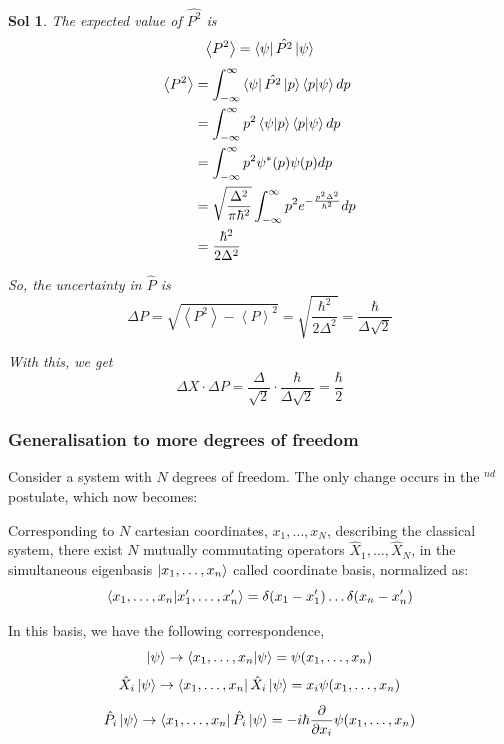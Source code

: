 \documentclass[12pt,a4paper]{report}
\newcommand{\rom}[1]{\Romannum{#1}}
\newcommand{\parder}[2]{\frac{\partial#1}{\partial#2}}
\newcommand{\expected}[1]{\left \langle #1 \right \rangle}
\newtheorem*{solution}{Sol}
\begin{document}
\begin{solution}
    The expected value of $\hat{P^2}$ is
    \begin{equation*}
        \expected{P^2} = \bra{\psi}\hat{P^2}\ket{\psi}
    \end{equation*}
    \begin{align*}
        \expected{P^2} &= \int_{-\infty}^{\infty}\bra{\psi}\hat{P^2}\ket{p}\bra{p}\ket{\psi} dp \\
        &= \int_{-\infty}^{\infty}p^2\bra{\psi}\ket{p}\bra{p}\ket{\psi} dp \\
        &= \int_{-\infty}^{\infty}p^2\psi^*(p)\psi(p) dp \\
        &= \sqrt{\frac{\Delta^2}{\pi \hbar^2}}\int_{-\infty}^{\infty}p^2e^{-\frac{p^2\Delta^2}{\hbar^2}} dp \\
        &= \frac{\hbar^2}{2\Delta^2}
    \end{align*}

    So, the uncertainty in $\hat{P}$ is
    \begin{equation*}
        \Delta P = \sqrt{\expected{P^2} - \expected{P}^2} = \sqrt{\frac{\hbar^2}{2\Delta^2}} = \frac{\hbar}{\Delta\sqrt{2}}
    \end{equation*}

    With this, we get
    \begin{equation*}
        \Delta X \cdot \Delta P = \frac{\Delta}{\sqrt{2}} \cdot \frac{\hbar}{\Delta\sqrt{2}} = \frac{\hbar}{2}
    \end{equation*}
\end{solution}
\newpage
\subsubsection{Generalisation to more degrees of freedom}

Consider a system with $N$ degrees of freedom. The only change occurs in the \rom{2}$^{nd}$ postulate, which now becomes:

Corresponding to $N$ cartesian coordinates, $x_1, \dots, x_N$, describing the classical system, there exist $N$ mutually commutating operators
$\hat{X}_1, \dots, \hat{X}_N$, in the simultaneous eigenbasis $\ket{x_1, \dots, x_n}$ called coordinate basis, normalized as:
\begin{equation*}
    \bra{x_1, \dots, x_n}\ket{x'_1, \dots, x'_n} = \delta(x_1-x'_1)\dots\delta(x_n-x'_n)
\end{equation*}

In this basis, we have the following correspondence,
\begin{equation*}
    \ket{\psi} \to \bra{x_1, \dots, x_n}\ket{\psi} = \psi(x_1, \dots, x_n)
\end{equation*}
\begin{equation*}
    \hat{X}_i\ket{\psi} \to \bra{x_1, \dots, x_n}\hat{X}_i\ket{\psi} = x_i\psi(x_1, \dots, x_n)
\end{equation*}
\begin{equation*}
    \hat{P}_i\ket{\psi} \to \bra{x_1, \dots, x_n}\hat{P}_i\ket{\psi} = -i\hbar\parder{}{x_i}\psi(x_1, \dots, x_n)
\end{equation*}
\end{document}
